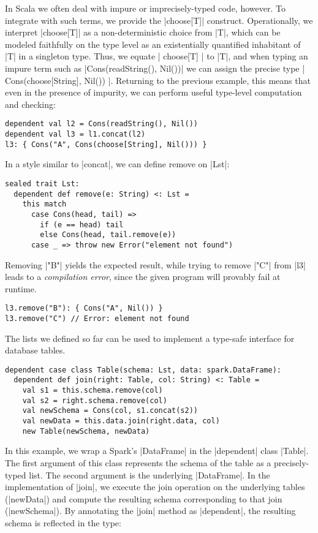 In Scala we often deal with impure or imprecisely-typed code, however.
To integrate with such terms, we provide the |choose[T]| construct.
Operationally, we interpret |choose[T]| as a non-deterministic choice from |T|, which can be modeled faithfully on the type level as an existentially quantified inhabitant of |T| in a singleton type.
Thus, we equate |{ choose[T] }| to |T|, and when typing an impure term such as |Cons(readString(), Nil())| we can assign the precise type |{ Cons(choose[String], Nil()) }|.
Returning to the previous example, this means that even in the presence of impurity, we can perform useful type-level computation and checking:

\begin{lstlisting}
dependent val l2 = Cons(readString(), Nil())
dependent val l3 = l1.concat(l2)
l3: { Cons("A", Cons(choose[String], Nil())) }
\end{lstlisting}

In a style similar to |concat|, we can define remove on |Lst|:

\begin{lstlisting}
sealed trait Lst:
  dependent def remove(e: String) <: Lst =
    this match
      case Cons(head, tail) =>
        if (e == head) tail
        else Cons(head, tail.remove(e))
      case _ => throw new Error("element not found")
\end{lstlisting}

\noindent
Removing |"B"| yields the expected result, while trying to remove |"C"| from |l3| leads to a \emph{compilation error}, since the given program will provably fail at runtime.

\begin{lstlisting}
l3.remove("B"): { Cons("A", Nil()) }
l3.remove("C") // Error: element not found
\end{lstlisting}

The lists we defined so far can be used to implement a type-safe interface for database tables.

\begin{lstlisting}
dependent case class Table(schema: Lst, data: spark.DataFrame):
  dependent def join(right: Table, col: String) <: Table =
    val s1 = this.schema.remove(col)
    val s2 = right.schema.remove(col)
    val newSchema = Cons(col, s1.concat(s2))
    val newData = this.data.join(right.data, col)
    new Table(newSchema, newData)
\end{lstlisting}

\noindent
In this example, we wrap a Spark's |DataFrame| in the |dependent| class |Table|.
The first argument of this class represents the schema of the table as a precisely-typed list.
The second argument is the underlying |DataFrame|.
In the implementation of |join|, we execute the join operation on the underlying tables (|newData|) and compute the resulting schema corresponding to that join (|newSchema|).
By annotating the |join| method as |dependent|, the resulting schema is reflected in the type:

